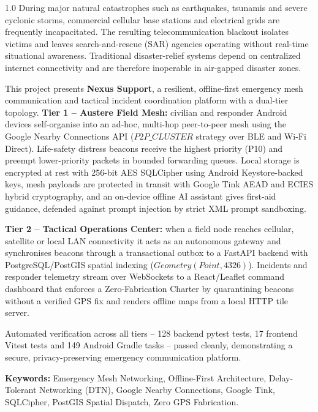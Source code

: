 \documentclass[12pt,a4paper]{report}
\begin{document}
\begin{spacing}{1.0}
During major natural catastrophes such as earthquakes, tsunamis and severe cyclonic storms, commercial cellular base stations and electrical grids are frequently incapacitated. The resulting telecommunication blackout isolates victims and leaves search-and-rescue (SAR) agencies operating without real-time situational awareness. Traditional disaster-relief systems depend on centralized internet connectivity and are therefore inoperable in air-gapped disaster zones.

This project presents \textbf{Nexus Support}, a resilient, offline-first emergency mesh communication and tactical incident coordination platform with a dual-tier topology. \textbf{Tier 1 -- Austere Field Mesh:} civilian and responder Android devices self-organise into an ad-hoc, multi-hop peer-to-peer mesh using the Google Nearby Connections API ($P2P\_CLUSTER$ strategy over BLE and Wi-Fi Direct). Life-safety distress beacons receive the highest priority (P10) and preempt lower-priority packets in bounded forwarding queues. Local storage is encrypted at rest with 256-bit AES SQLCipher using Android Keystore-backed keys, mesh payloads are protected in transit with Google Tink AEAD and ECIES hybrid cryptography, and an on-device offline AI assistant gives first-aid guidance, defended against prompt injection by strict XML prompt sandboxing.

\textbf{Tier 2 -- Tactical Operations Center:} when a field node reaches cellular, satellite or local LAN connectivity it acts as an autonomous gateway and synchronises beacons through a transactional outbox to a FastAPI backend with PostgreSQL/PostGIS spatial indexing ($Geometry(Point, 4326)$). Incidents and responder telemetry stream over WebSockets to a React/Leaflet command dashboard that enforces a Zero-Fabrication Charter by quarantining beacons without a verified GPS fix and renders offline maps from a local HTTP tile server.

Automated verification across all tiers -- 128 backend pytest tests, 17 frontend Vitest tests and 149 Android Gradle tasks -- passed cleanly, demonstrating a secure, privacy-preserving emergency communication platform.
\end{spacing}

\vspace{0.4cm}
\noindent\textbf{Keywords:} Emergency Mesh Networking, Offline-First Architecture, Delay-Tolerant Networking (DTN), Google Nearby Connections, Google Tink, SQLCipher, PostGIS Spatial Dispatch, Zero GPS Fabrication.
\newpage
\end{document}
